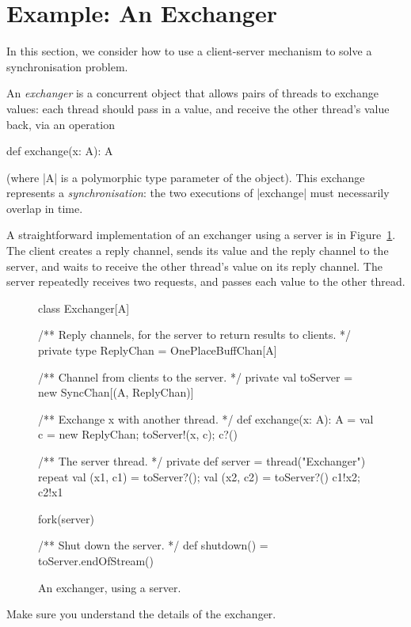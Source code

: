 \section{Example: An Exchanger}

In this section, we consider how to use a client-server mechanism to solve a
synchronisation problem.  

An \emph{exchanger} is a concurrent object that
allows pairs of threads to exchange values: each thread should pass in a
value, and receive the other thread's value back, via an operation
\begin{scala}
  def exchange(x: A): A 
\end{scala}
(where |A| is a polymorphic type parameter of the object).  This exchange
represents a \emph{synchronisation}: the two executions of |exchange| must
necessarily overlap in time.

A straightforward implementation of an exchanger using a server is in
Figure~\ref{fig:exchanger}.  The client creates a reply channel, sends its
value and the reply channel to the server, and waits to receive the other
thread's value on its reply channel.  The server repeatedly receives two
requests, and passes each value to the other thread.


\begin{figure}
\begin{scala}
class Exchanger[A]{
  /** Reply channels, for the server to return results to clients. */
  private type ReplyChan = OnePlaceBuffChan[A]

  /** Channel from clients to the server. */
  private val toServer = new SyncChan[(A, ReplyChan)]

  /** Exchange x with another thread. */
  def exchange(x: A): A = {
    val c = new ReplyChan; toServer!(x, c); c?()
  }

  /** The server thread. */
  private def server = thread("Exchanger"){
    repeat{
      val (x1, c1) = toServer?(); val (x2, c2) = toServer?()
      c1!x2; c2!x1
    }
  }

  fork(server)

  /** Shut down the server. */
  def shutdown() = toServer.endOfStream()
}
\end{scala}
\caption{An exchanger, using a server.}
\label{fig:exchanger}
\end{figure}


\begin{instruction}
Make sure you understand the details of the exchanger.
\end{instruction}

